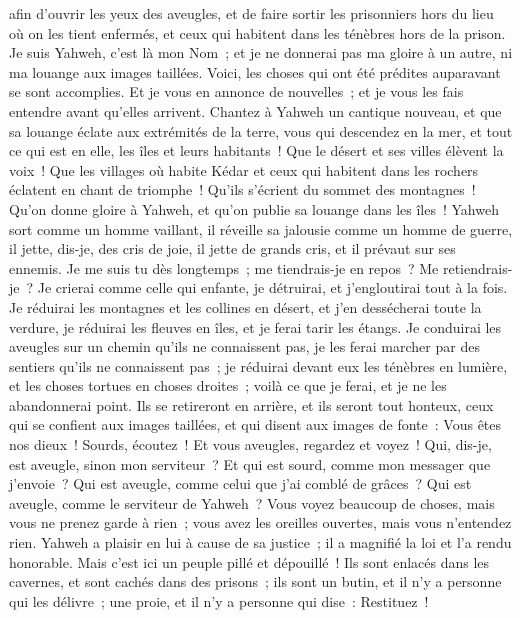 \begin{multicols}{2}
afin d'ouvrir les yeux des aveugles, et de faire sortir les prisonniers hors du lieu où on les tient enfermés, et ceux qui habitent dans les ténèbres hors de la prison.
Je suis Yahweh, c'est là mon Nom~; et je ne donnerai pas ma gloire à un autre, ni ma louange aux images taillées.
Voici, les choses qui ont été prédites auparavant se sont accomplies. Et je vous en annonce de nouvelles~; et je vous les fais entendre avant qu'elles arrivent.
Chantez à Yahweh un cantique nouveau, et que sa louange éclate aux extrémités de la terre, vous qui descendez en la mer, et tout ce qui est en elle, les îles et leurs habitants~!
Que le désert et ses villes élèvent la voix~! Que les villages où habite Kédar et ceux qui habitent dans les rochers éclatent en chant de triomphe~! Qu'ils s'écrient du sommet des montagnes~!
Qu'on donne gloire à Yahweh, et qu'on publie sa louange dans les îles~!
Yahweh sort comme un homme vaillant, il réveille sa jalousie comme un homme de guerre, il jette, dis-je, des cris de joie, il jette de grands cris, et il prévaut sur ses ennemis.
Je me suis tu dès longtemps~; me tiendrais-je en repos~? Me retiendrais-je~? Je crierai comme celle qui enfante, je détruirai, et j'engloutirai tout à la fois.
Je réduirai les montagnes et les collines en désert, et j'en dessécherai toute la verdure, je réduirai les fleuves en îles, et je ferai tarir les étangs.
Je conduirai les aveugles sur un chemin qu'ils ne connaissent pas, je les ferai marcher par des sentiers qu'ils ne connaissent pas~; je réduirai devant eux les ténèbres en lumière, et les choses tortues en choses droites~; voilà ce que je ferai, et je ne les abandonnerai point.
Ils se retireront en arrière, et ils seront tout honteux, ceux qui se confient aux images taillées, et qui disent aux images de fonte~: Vous êtes nos dieux~!
Sourds, écoutez~! Et vous aveugles, regardez et voyez~!
Qui, dis-je, est aveugle, sinon mon serviteur~? Et qui est sourd, comme mon messager que j'envoie~? Qui est aveugle, comme celui que j'ai comblé de grâces~? Qui est aveugle, comme le serviteur de Yahweh~?
Vous voyez beaucoup de choses, mais vous ne prenez garde à rien~; vous avez les oreilles ouvertes, mais vous n'entendez rien.
Yahweh a plaisir en lui à cause de sa justice~; il a magnifié la loi et l'a rendu honorable.
Mais c'est ici un peuple pillé et dépouillé~! Ils sont enlacés dans les cavernes, et sont cachés dans des prisons~; ils sont un butin, et il n'y a personne qui les délivre~; une proie, et il n'y a personne qui dise~: Restituez~!

\end{multicols}
